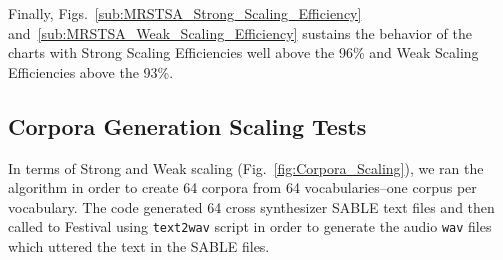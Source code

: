 \documentclass[10pt,journal,compsoc]{IEEEtran}
\begin{document}
Finally, Figs.~\ref{sub:MRSTSA_Strong_Scaling_Efficiency} and~\ref{sub:MRSTSA_Weak_Scaling_Efficiency} sustains the behavior of the charts with Strong Scaling Efficiencies well above the 96\% and Weak Scaling Efficiencies above the 93\%.



















\subsection{Corpora Generation Scaling Tests}

In terms of Strong and Weak scaling (Fig.~\ref{fig:Corpora_Scaling}), we ran the algorithm in order to create 64 corpora from 64 vocabularies--one corpus per vocabulary. The code generated 64 cross synthesizer SABLE text files and then called to Festival using \texttt{text2wav} script in order to generate the audio \texttt{wav} files which uttered the text in the SABLE files.
\end{document}
